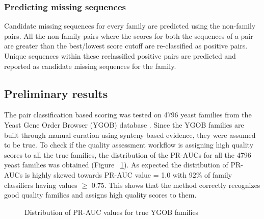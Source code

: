 \documentclass{article}
\begin{document}
			\subsubsection{Predicting missing sequences}
			Candidate missing sequences for every family are predicted using the non-family pairs. All the non-family pairs where the scores for both the sequences of a pair are greater than the best/lowest score cutoff are re-classified as positive pairs. Unique sequences within these reclassified positive pairs are predicted and reported as candidate missing sequences for the family.
			
		\subsection{Preliminary results}
		The pair classification based scoring was tested on 4796 yeast families from the Yeast Gene Order Browser (YGOB) database \citep{byrne2005yeast}. Since the YGOB families are built through manual curation using synteny based evidence, they were assumed to be true. To check if the quality assessment workflow is assigning high quality scores to all the true families, the distribution of the PR-AUCs for all the 4796 yeast families was obtained (Figure ~\ref{fig:hist_pr-auc_true_ygob}). As expected the distribution of PR-AUCs is highly skewed towards PR-AUC value = 1.0 with 92\% of family classifiers having values $\geq$ 0.75. This shows that the method correctly recognizes good quality families and assigns high quality scores to them.
		
		\begin{figure}
			\caption{Distribution of PR-AUC values for true YGOB families}
			\label{fig:hist_pr-auc_true_ygob}
		\end{figure}
		
\end{document}
